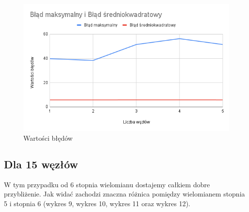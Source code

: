 \documentclass{article}
\begin{document}
\begin{figure}[H]
  \centering
  \begin{minipage}[b]{0.4\textwidth}
    \includegraphics[width=\textwidth]{img08.png}
    \caption{Wartości błędów}
  \end{minipage}
\end{figure}

\newpage

\subsection{Dla 15 węzłów}

\noindent
W tym przypadku od 6 stopnia wielomianu dostajemy całkiem dobre przybliżenie. Jak widać zachodzi znaczna różnica pomiędzy wielomianem stopnia 5 i stopnia 6 (wykres 9, wykres 10, wykres 11 oraz wykres 12).
\end{document}
